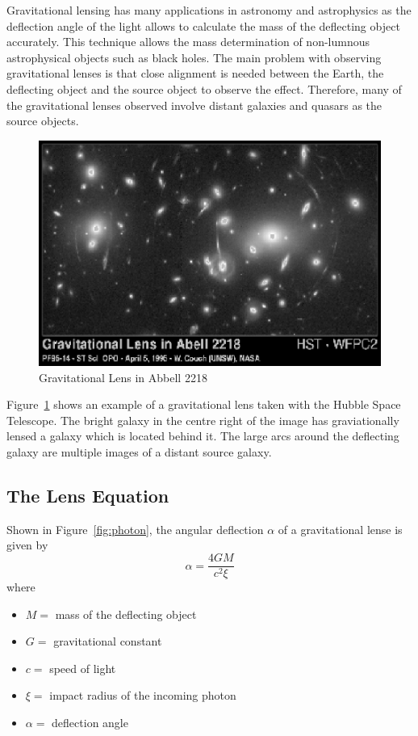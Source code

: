 \documentclass[a4paper]{IEEEtran}
\begin{document}
Gravitational lensing has many applications in astronomy and astrophysics
as the deflection angle of the light allows to calculate the mass
of the deflecting object accurately. This technique allows the mass determination
of non-lumnous astrophysical objects such as black holes.
The main problem with observing gravitational lenses is that close
alignment is needed between the Earth, the deflecting object and 
the source object to observe the effect. Therefore, many of the gravitational
lenses observed involve distant galaxies and quasars as the source objects.

\begin{figure}[h] 
    \caption{Gravitational Lens in Abbell 2218} 
    \label{fig:abbell} 
    \begin{center}
        \includegraphics[width=0.9\columnwidth]{images/hubble.eps}
    \end{center}
\end{figure}

Figure~\ref{fig:abbell} shows an example of a gravitational lens taken with the 
Hubble Space Telescope. The bright galaxy in the centre right of the image
has graviationally lensed a galaxy which is located behind it. 
The large arcs around the deflecting galaxy are multiple images of 
a distant source galaxy.

\subsection{The Lens Equation}
Shown in Figure~\ref{fig:photon}, the angular deflection $\alpha$ of a 
gravitational lense is given by
\begin{equation}    
    \alpha = \frac{4GM}{c^2 \xi}
\end{equation}
where
\begin{itemize}
    \item $M = $ mass of the deflecting object
    \item $G = $ gravitational constant
    \item $c = $ speed of light
    \item $\xi = $ impact radius of the incoming photon
    \item $\alpha = $ deflection angle
\end{itemize}
\end{document}
